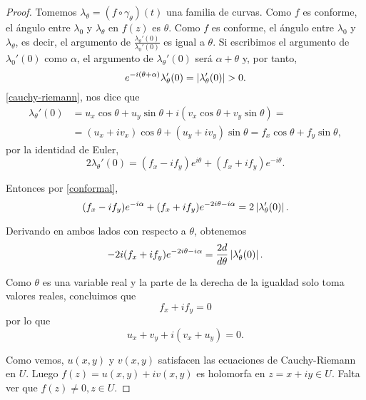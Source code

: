\begin{proof}
    Tomemos $\lambda_\theta = (f \circ  \gamma_\theta)(t)$ una familia de curvas. Como $f$ es conforme, el ángulo entre $\lambda_0$ y $\lambda_{\theta}$ en $f(z)$ es $\theta$. Como $f$ es conforme, el ángulo entre $\lambda_0$ y $\lambda_{\theta}$, es decir, el argumento de $\frac{\lambda_{\theta}'(0)}{\lambda_0' (0)}$ es igual a $\theta$. Si escribimos el argumento de $\lambda_0'(0)$ como $\alpha$, el argumento de $\lambda_{\theta}'(0)$ será $\alpha+\theta$ y, por tanto,
    \begin{equation}
    \label{conformal}
        e^{-i(\theta + \alpha)} \lambda_{\theta}'(0)= \left\lvert\lambda_{\theta}'(0)\right\rvert > 0.
    \end{equation}
    \ref{cauchy-riemann}, nos dice que
    \begin{equation*}
    \begin{split}
        \lambda_{\theta}'(0) & = u_x \cos \theta + u_y \sin \theta + i(v_x \cos \theta + v_y \sin \theta) = \\
                             & = (u_x + iv_x) \cos \theta + (u_y + i v_y) \sin \theta = f_x \cos \theta + f_y \sin \theta,
    \end{split}
    \end{equation*}
    por la identidad de Euler,
    \begin{equation*}
        2 \lambda_{\theta}'(0) = (f_x - i f_y) e^{i \theta} + (f_x + i f_y) e^{-i \theta}.
    \end{equation*}

    Entonces por \ref{conformal},
    \begin{equation*}
         (f_x - i f_y) e^{-i \alpha} + (f_x + i f_y) e^{-2i \theta -i  \alpha} = 2 \left\lvert\lambda_{\theta}'(0)\right\rvert.
    \end{equation*}

    Derivando en ambos lados con respecto a $\theta$, obtenemos
    \begin{equation*}
        -2i (f_x + i f_y) e^{-2i \theta - i \alpha} = \frac{2d}{d \theta} \left\lvert\lambda_{\theta}'(0)\right\rvert.
    \end{equation*}

    Como $\theta$ es una variable real y la parte de la derecha de la igualdad solo toma valores reales, concluimos que %
    \begin{equation*}
        f_x + i f_y = 0
    \end{equation*}
    por lo que
    \begin{equation*}
        u_x + v_y + i(v_x + u_y) = 0.
    \end{equation*}

    Como vemos, $u(x,y)$ y $v(x,y)$ satisfacen las ecuaciones de Cauchy-Riemann en $U$. Luego $f(z) = u(x,y) + i v(x,y)$ es holomorfa en $z = x + iy \in U$. Falta ver que $f(z) \not = 0, z \in U$. %
\end{proof}

